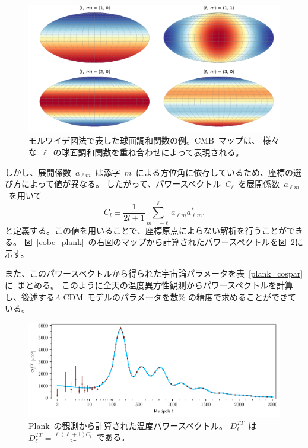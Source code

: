\begin{figure}[htbp]
  \centering
  \includegraphics[width=1\columnwidth]{2_cosmology/figs/kyumen_plot.pdf}
  \caption{モルワイデ図法で表した球面調和関数の例。CMB~マップは、
  様々な~$\ell$~の球面調和関数を重ね合わせによって表現される。}
  \label{kyumen_plot}
\end{figure}



しかし、展開係数~$a_{\ell m}$~は添字~$m$~による方位角に依存しているため、座標の選び方によって値が異なる。
したがって、パワースペクトル~$C_\ell$~を展開係数~$a_{\ell m}$~を用いて
\begin{equation}
 C_l \equiv \frac{1}{2l+1}\sum_{m=-\ell}^{\ell}a_{\ell m} a_{\ell m}^* . \label{equ_cl}
\end{equation}
と定義する。この値を用いることで、座標原点によらない解析を行うことができる。
図~\ref{cobe_plank}~の右図のマップから計算されたパワースペクトルを図~\ref{plank_cltt}に示す。


また、このパワースペクトルから得られた宇宙論パラメータを表~\ref{plank_cospar}に~まとめる。
このように全天の温度異方性観測からパワースペクトルを計算し、後述する$\Lambda$-CDM~モデルのパラメータを数$\%$
の精度で求めることができている。
\begin{figure}[htbp]
  \centering
  \includegraphics[width=0.9\columnwidth]{2_cosmology/figs/plank_cltt.pdf}
  \caption{Plank~の観測から計算された温度パワースペクトル\cite{plank}。
  $D_{\ell}^{TT}$~は~$D_{\ell}^{TT} = \frac{\ell (\ell +1) C_l}{2 \pi}$~である。}
  \label{plank_cltt}
\end{figure}

